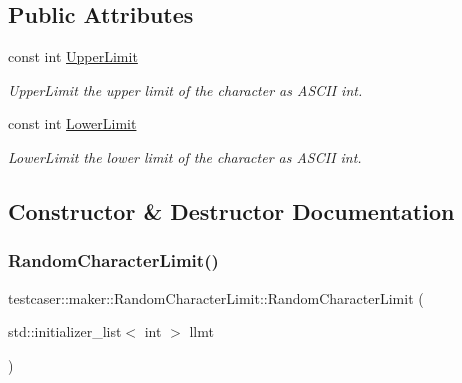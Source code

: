 \subsection*{Public Attributes}
\begin{DoxyCompactItemize}
\item 
const int \mbox{\hyperlink{classtestcaser_1_1maker_1_1RandomCharacterLimit_adf6f29860db063472c941a169b918667}{Upper\+Limit}}
\begin{DoxyCompactList}\small\item\em Upper\+Limit the upper limit of the character as A\+S\+C\+II int. \end{DoxyCompactList}\item 
const int \mbox{\hyperlink{classtestcaser_1_1maker_1_1RandomCharacterLimit_a152f8b1958ceec1128967cefa40891d9}{Lower\+Limit}}
\begin{DoxyCompactList}\small\item\em Lower\+Limit the lower limit of the character as A\+S\+C\+II int. \end{DoxyCompactList}\end{DoxyCompactItemize}


\subsection{Constructor \& Destructor Documentation}
\mbox{\label{classtestcaser_1_1maker_1_1RandomCharacterLimit_a2ebd894bf7f536219bf7a917ed036c55}} 
\subsubsection{\texorpdfstring{RandomCharacterLimit()}{RandomCharacterLimit()}\hspace{0.1cm}{\footnotesize\ttfamily [1/2]}}
{\footnotesize\ttfamily testcaser\+::maker\+::\+Random\+Character\+Limit\+::\+Random\+Character\+Limit (\begin{DoxyParamCaption}\item[{std\+::initializer\+\_\+list$<$ int $>$}]{llmt }\end{DoxyParamCaption})\hspace{0.3cm}{\ttfamily [inline]}}



